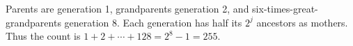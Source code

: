 Parents are generation 1, grandparents generation 2, and six-times-great-grandparents generation 8. Each generation has half its $2^j$ ancestors as mothers. Thus the count is $1+2+\cdots+128=2^8-1=\boxed{255}$.
